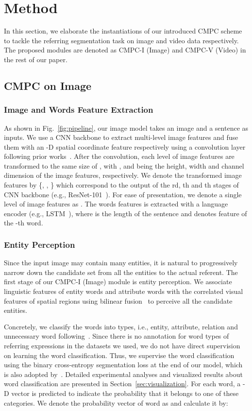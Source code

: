 \documentclass[10pt,journal,cspaper,compsoc]{IEEEtran}
\begin{document}
\section{Method}
In this section, we elaborate the instantiations of our introduced CMPC scheme to tackle the referring segmentation task on image and video data respectively. 
The proposed modules are denoted as CMPC-I (Image) and CMPC-V (Video) in the rest of our paper.

\subsection{CMPC on Image}
\subsubsection{Image and Words Feature Extraction}
As shown in Fig.~\ref{fig:pipeline}, our image model takes an image and a sentence as inputs. 
We use a CNN backbone to extract multi-level image features  and fuse them with an -D spatial coordinate feature  respectively using a  convolution layer following prior works~\cite{liu2017recurrent}\cite{ye2019cross}. 
After the convolution, each level of image features are transformed to the 
same size of , 
with ,  and  being the height, width and channel dimension of the image features, respectively. 
We denote the transformed image features by \{, , \} which correspond to the output of the rd, th and th stages of CNN backbone (e.g., ResNet-101~\cite{he2016deep}).
For ease of presentation, we denote a single level of image features as . 
The words features  is extracted with a language 
encoder (e.g., LSTM~\cite{hochreiter1997long}), where  is the length 
of the sentence and  denotes 
feature of the -th word.

\subsubsection{Entity Perception}
\label{sec:ep}
Since the input image may contain many entities, it is natural to progressively narrow down the candidate set from all the entities to the actual referent. 
The first stage of our CMPC-I (Image) module is entity perception. 
We associate linguistic features of entity words and attribute words 
with the correlated visual features of spatial regions using bilinear fusion~\cite{BenMUTAN} to perceive all the candidate entities. 

Concretely, we classify the words into  types, i.e., entity, attribute, relation and unnecessary word following~\cite{yang2019cross}. 
Since there is no annotation for word types of referring expressions in the datasets we used, we do not have direct supervision on learning the word classification. 
Thus, we supervise the word classification using the binary cross-entropy segmentation loss at the end of our model, which is also adopted by~\cite{yang2019cross}. 
Detailed experimental analyses and visualized results about word classification are presented in Section~\ref{sec:visualization}.
For each word, a -D vector is predicted to indicate the probability that it belongs to one of these  categories. 
We denote the probability vector of word  as  and calculate it by:
\end{document}

